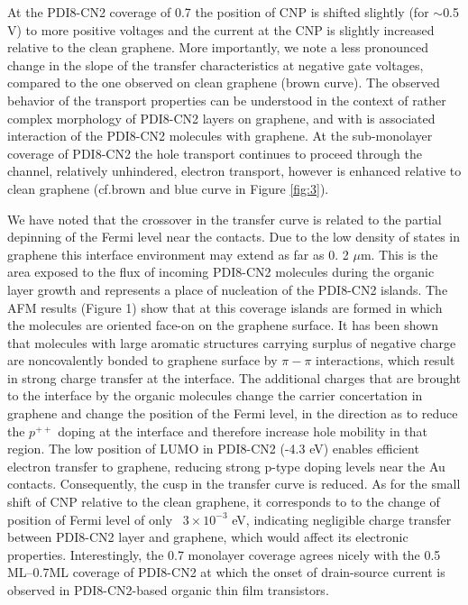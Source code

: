 \documentclass[preprint,aip,jap]{revtex4-2}
\begin{document}
At the PDI8-CN2 coverage of 0.7 the position of CNP is shifted slightly (for $\sim$0.5 V)  to more positive voltages and the current at the CNP is slightly increased relative to the clean graphene.
  More importantly, we note a less pronounced change in the slope of the transfer characteristics at negative gate voltages, compared to the one observed on clean graphene (brown curve).
 The observed behavior of the transport properties can be understood in the context of rather complex morphology of PDI8-CN2 layers on graphene, and with is associated interaction of the PDI8-CN2 molecules with graphene.
 At the sub-monolayer coverage of PDI8-CN2 the hole transport continues to proceed through the channel, relatively unhindered, electron transport, however is enhanced relative to clean graphene (cf.brown and blue curve in Figure \ref{fig:3}).

 We have noted that the crossover in the transfer curve is related to the partial depinning of the Fermi level near the contacts.
 Due to the low density of states in graphene this interface environment may extend as far as 0.
2 $\mu$m\cite{mueller-2009}.
 This is the area exposed to the flux of incoming PDI8-CN2 molecules during the organic layer growth and represents a place of nucleation of the PDI8-CN2 islands.
 The AFM results (Figure 1) show that at this coverage islands are formed in which the molecules are oriented face-on on the graphene surface.
 It has been shown\cite{su-2009} that molecules with large aromatic structures carrying surplus of negative charge are noncovalently bonded to graphene surface by $\pi-\pi$ interactions, which result in strong charge transfer at the interface.
 The additional charges that are brought to the interface by the organic molecules change the carrier concertation in graphene and change the position of the Fermi level, in the direction as to reduce the $p^{++}$ doping at the interface and therefore increase hole mobility in that region.
 The low position of LUMO in PDI8-CN2 (-4.3 eV)\cite{jones-2007} enables efficient electron transfer to graphene, reducing strong p-type doping levels near the Au contacts.
 Consequently, the cusp in the transfer curve is reduced.
   As for the small shift of CNP relative to the clean graphene, it corresponds to to the change of position of Fermi level of only ~$3\times10^{-3}$ eV, indicating negligible charge transfer between PDI8-CN2 layer and graphene, which would affect its electronic properties.
 Interestingly, the 0.7 monolayer coverage agrees nicely with the 0.5 ML--0.7ML coverage of PDI8-CN2 at which the onset of  drain-source current is observed in PDI8-CN2-based organic thin film transistors\cite{liscio-2013}.
 
\end{document}
